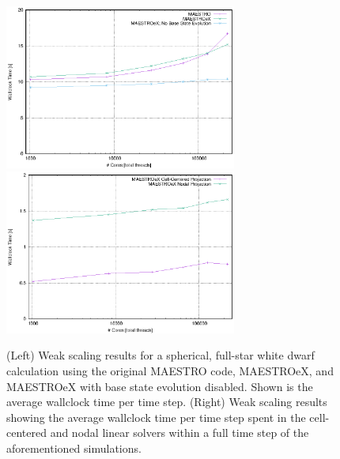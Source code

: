 \begin{figure}[htb]
\begin{center}
\includegraphics[width=3.0in]{./figs/MAESTRO_scaling1} \hspace{0.5em}
\includegraphics[width=3.0in]{./figs/MAESTRO_scaling2}
\caption{\label{fig:scaling} (Left) Weak scaling results for a spherical, full-star white dwarf calculation using the original MAESTRO code, MAESTROeX, and MAESTROeX with base state evolution disabled.  Shown is the average wallclock time per time step.
(Right) Weak scaling results showing the average wallclock time per time step spent in the cell-centered and nodal linear solvers within a full time step of the aforementioned simulations.}
\end{center}
\end{figure}

